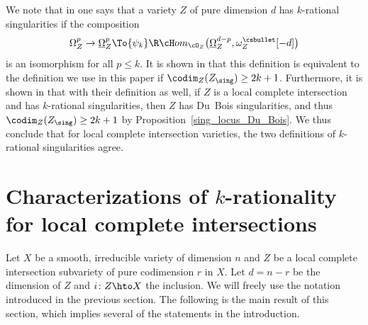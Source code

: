 \begin{rmk}\label{rmk_equiv_two_defi}
We note that in \cite{FL2} one says that a variety $Z$ of pure dimension $d$ has $k$-rational singularities if the composition
\[\Omega_Z^p\to \underline{\Omega}_Z^p\To{\psi_k}\R\cH om_{\cO_Z}\big(\underline{\Omega}_Z^{d-p},\omega_Z^{\csbullet}[-d]\big)\]
is an isomorphism for all $p\leq k$. It is shown in \cite[Cor.\,3.17]{FL2} that this definition is equivalent to the definition we use in this paper if $\codim_Z(Z_\sing)\geq 2k+1$.
Furthermore, it is shown in \cite[Th.\,3.20]{FL2} that with their definition as well, if $Z$ is a local complete intersection and has $k$-rational singularities,
then $Z$ has Du~Bois singularities, and thus $\codim_Z(Z_\sing)\geq 2k+1$ by Proposition~\ref{sing_locus_Du_Bois}. We thus conclude
that for local complete intersection varieties, the two definitions of $k$-rational singularities agree.
\end{rmk}

\section{Characterizations of \texorpdfstring{$k$}{k}-rationality for local complete intersections}\label{section3}

Let $X$ be a smooth, irreducible variety of dimension $n$ and $Z$ be a local complete intersection subvariety of pure codimension $r$ in $X$. Let $d=n-r$ be the dimension of $Z$ and $i\colon Z\hto X$ the inclusion. We will freely use the notation introduced in the previous section.
The following is the main result of this section, which implies several of the statements in the introduction.

